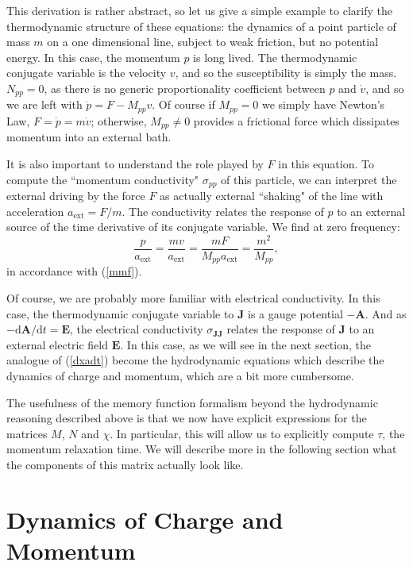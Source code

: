 \documentclass[10pt, oneside]{book}
\begin{document}
\begin{doublespace}
This derivation is rather abstract, so let us give a simple example to clarify the thermodynamic structure of these equations: the dynamics of a point particle of mass $m$ on a one dimensional line, subject to weak friction, but no potential energy.   In this case, the momentum $p$ is long lived.   The thermodynamic conjugate variable is the velocity $v$, and so the susceptibility is simply the mass.    $N_{pp}=0$, as there is no generic proportionality coefficient between $p$ and $\dot{v}$, and so we are left with $\dot{p} = F - M_{pp}v$.   Of course if $M_{pp}=0$ we simply have Newton's Law, $F = \dot{p} = m\dot{v}$; otherwise, $M_{pp}\ne 0$ provides a frictional force which dissipates momentum into an external bath.  

It is also important to understand the role played by $F$ in this equation.  To compute the ``momentum conductivity" $\sigma_{pp}$ of this particle, we can interpret the external driving by the force $F$ as actually external ``shaking" of the line with acceleration $a_{\mathrm{ext}}=F/m$.  The conductivity relates the response of $p$ to an external source of the time derivative of its conjugate variable.  We find at zero frequency: \begin{equation}
\frac{p}{a_{\mathrm{ext}}} = \frac{mv}{a_{\mathrm{ext}}} = \frac{mF}{M_{pp}a_{\mathrm{ext}}} = \frac{m^2}{M_{pp}},
\end{equation}in accordance with (\ref{mmf}).

Of course, we are probably more familiar with electrical conductivity.   In this case, the thermodynamic conjugate variable to $\mathbf{J}$ is a gauge potential $-\mathbf{A}$.   And as $-\mathrm{d}\mathbf{A}/\mathrm{d}t = \mathbf{E}$,  the electrical conductivity $\sigma_{\mathbf{JJ}}$ relates the response of $\mathbf{J}$ to an external electric field $\mathbf{E}$.   In this case, as we will see in the next section, the analogue of (\ref{dxadt}) become the hydrodynamic equations which describe the dynamics of charge and momentum, which are a bit more cumbersome.

The usefulness of the memory function formalism beyond the hydrodynamic reasoning described above is that we now have explicit expressions for the matrices $M$, $N$ and $\chi$.   In particular, this will allow us to explicitly compute $\tau$, the momentum relaxation time.   We will describe more in the following section what the components of this matrix actually look like.

\section{Dynamics of Charge and Momentum}
\label{sec:mhd}


\end{doublespace}
\end{document}

